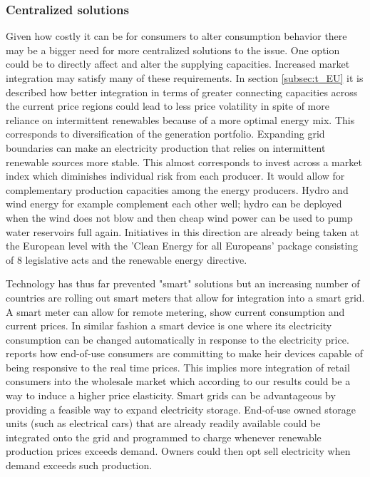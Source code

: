\subsubsection{Centralized solutions}
Given how costly it can be for consumers to alter consumption behavior there may be a bigger need for more centralized solutions to the issue. One option could be to directly affect and alter the supplying capacities.
Increased market integration may satisfy many of these requirements. In section \ref{subsec:t_EU} it is described how better integration in terms of greater connecting capacities across the current price regions could lead to less price volatility in spite of more reliance on intermittent renewables because of a more optimal energy mix. This corresponds to diversification of the generation portfolio. Expanding grid boundaries can make an electricity production that relies on intermittent renewable sources more stable. This almost corresponds to invest across a market index which diminishes individual risk from each producer. It would allow for complementary production capacities among the energy producers. Hydro and wind energy for example complement each other well;  hydro can be deployed when the wind does not blow and then cheap wind power can be used to pump water reservoirs full again. Initiatives in this direction are already being taken at the European level with the 'Clean Energy for all Europeans' package consisting of 8 legislative acts and the renewable energy directive.
\bigskip

Technology has thus far prevented "smart" solutions but an increasing number of countries are rolling out smart meters that allow for integration into a smart grid. A smart meter can allow for remote metering, show current consumption and current prices. In similar fashion a smart device is one where its electricity consumption can be changed automatically in response to the electricity price.
\citet{biggar2014economics} reports how end-of-use consumers are committing to make heir devices capable of being responsive to the real time prices. This implies more integration of retail consumers into the wholesale market which according to our results could be a way to induce a higher price elasticity. Smart grids can be advantageous by providing a feasible way to expand electricity storage. End-of-use owned storage units (such as electrical cars) that are already readily available could be integrated onto the grid and programmed to charge whenever renewable production prices exceeds demand. Owners could then opt sell electricity when demand exceeds such production.



